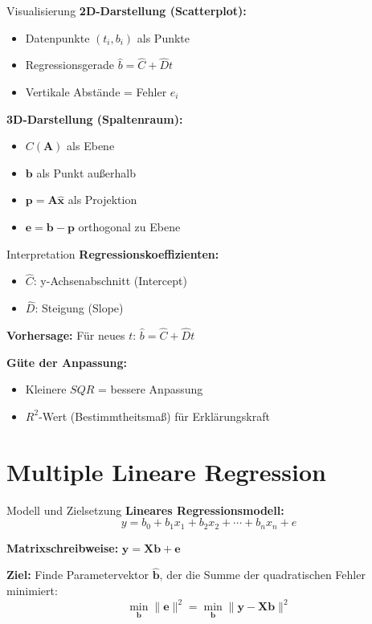 \documentclass[a4paper, fontsize=7pt]{scrartcl}
\begin{document}
\begin{subbox}{Visualisierung}
\textbf{2D-Darstellung (Scatterplot):}
\begin{itemize}
    \item Datenpunkte $(t_i, b_i)$ als Punkte
    \item Regressionsgerade $\hat{b} = \hat{C} + \hat{D}t$
    \item Vertikale Abstände = Fehler $e_i$
\end{itemize}

\textbf{3D-Darstellung (Spaltenraum):}
\begin{itemize}
    \item $C(\mathbf{A})$ als Ebene
    \item $\mathbf{b}$ als Punkt außerhalb
    \item $\mathbf{p} = \mathbf{A}\hat{\mathbf{x}}$ als Projektion
    \item $\mathbf{e} = \mathbf{b} - \mathbf{p}$ orthogonal zu Ebene
\end{itemize}
\end{subbox}

\begin{subbox}{Interpretation}
\textbf{Regressionskoeffizienten:}
\begin{itemize}
    \item $\hat{C}$: y-Achsenabschnitt (Intercept)
    \item $\hat{D}$: Steigung (Slope)
\end{itemize}

\textbf{Vorhersage:}
Für neues $t$: $\hat{b} = \hat{C} + \hat{D}t$

\textbf{Güte der Anpassung:}
\begin{itemize}
    \item Kleinere $SQR$ = bessere Anpassung
    \item $R^2$-Wert (Bestimmtheitsmaß) für Erklärungskraft
\end{itemize}
\end{subbox}

\section{Multiple Lineare Regression}

\begin{mainbox}{Modell und Zielsetzung}
\textbf{Lineares Regressionsmodell:}
\[y = b_0 + b_1x_1 + b_2x_2 + \cdots + b_nx_n + e\]

\textbf{Matrixschreibweise:} $\mathbf{y} = \mathbf{Xb} + \mathbf{e}$

\textbf{Ziel:} Finde Parametervektor $\hat{\mathbf{b}}$, der die Summe der quadratischen Fehler minimiert:
\[\min_{\mathbf{b}} \|\mathbf{e}\|^2 = \min_{\mathbf{b}} \|\mathbf{y} - \mathbf{Xb}\|^2\]
\end{mainbox}
\end{document}
